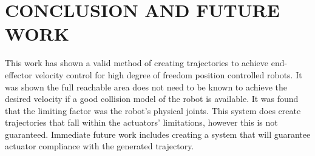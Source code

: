 \section{CONCLUSION AND FUTURE WORK}\label{sec:conc}
This work has shown a valid method of creating trajectories to achieve end-effector velocity control for high degree of freedom position controlled robots.  It was shown the full reachable area does not need to be known to achieve the desired velocity if a good collision model of the robot is available.  It was found that the limiting factor was the robot's physical joints.  This system does create trajectories that fall within the actuators' limitations, however this is not guaranteed.  Immediate future work includes creating a system that will guarantee actuator compliance with the generated trajectory.